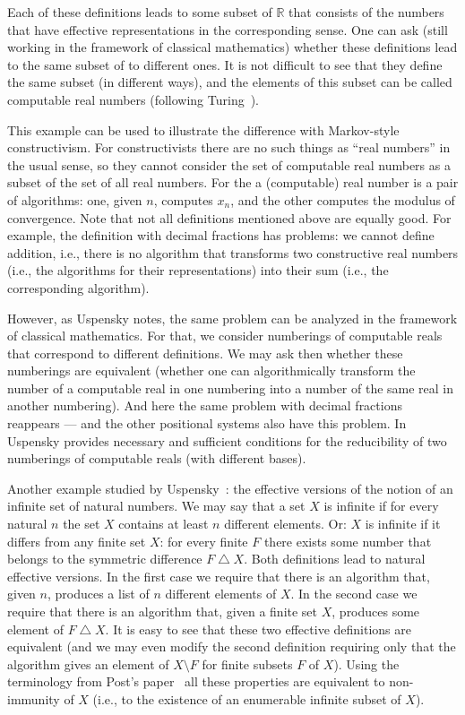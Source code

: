 \documentclass[12pt]{article}
\theoremstyle{remark}
\begin{document}
Each of these definitions leads to some subset of $\mathbb{R}$ that consists of the numbers that have effective representations in the corresponding sense. One can ask (still working in the framework of classical mathematics) whether these definitions lead to the same subset of to different ones. It is not difficult to see that they define the same subset (in different ways), and the elements of this subset can be called computable real numbers (following Turing~\cite{Turing1937}).

This example can be used to illustrate the difference with Markov-style constructivism. For constructivists there are no such things as ``real numbers'' in the usual sense, so they cannot consider the set of computable real numbers as a subset of the set of all real numbers. For the a (computable) real number is a pair of algorithms: one, given $n$, computes $x_n$, and the other computes the modulus of convergence. Note that not all definitions mentioned above are equally good. For example, the definition with decimal fractions has problems: we cannot define addition, i.e., there is no algorithm that transforms two constructive real numbers (i.e., the algorithms for their representations) into their sum (i.e., the corresponding algorithm).

However, as Uspensky notes, the same problem can be analyzed in the framework of classical mathematics. For that, we consider numberings of computable reals that correspond to different definitions. We may ask then whether these numberings are equivalent (whether one can algorithmically transform the number of a computable real in one numbering into a number of the same real in another numbering). And here the same problem with decimal fractions reappears --- and the other positional systems also have this problem. In~\cite{1960} Uspensky provides necessary and sufficient conditions for the reducibility of two numberings of computable reals (with different bases).

Another example studied by Uspensky~\cite{1960a}: the effective versions of the notion of an infinite set of natural numbers. We may say that a set $X$ is infinite if for every natural $n$ the set $X$ contains at least $n$ different elements. Or: $X$ is infinite if it differs from any finite set $X$: for every finite $F$ there exists some number that belongs to the symmetric difference $F\bigtriangleup X$. Both definitions lead to natural effective versions. In the first case we require that there is an algorithm that, given $n$, produces a list of $n$ different elements of $X$. In the second case we require that there is an algorithm that, given a finite set $X$, produces some element of $F\bigtriangleup X$. It is easy to see that these two effective definitions are equivalent (and we may even modify the second definition requiring only that the algorithm gives an element of $X\setminus F$ for finite subsets $F$ of $X$). Using the terminology from Post's paper~\cite{Post1944} all these properties are equivalent to non-immunity of $X$ (i.e., to the existence of an enumerable infinite subset of $X$).
\end{document}
